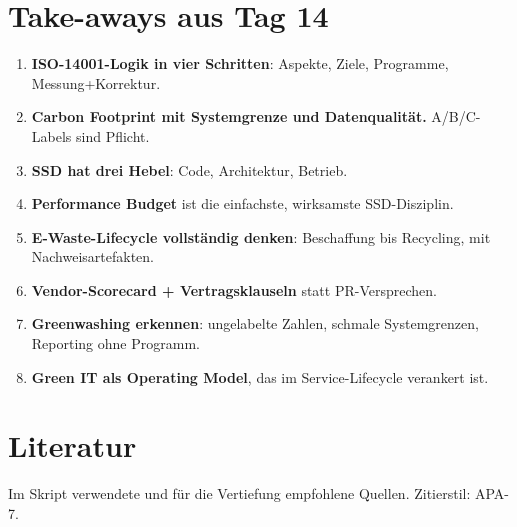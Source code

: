 \documentclass[11pt,a4paper,oneside]{article}
\begin{document}
\section{Take-aways aus Tag 14}

\begin{enumerate}
  \item \textbf{ISO-14001-Logik in vier Schritten}: Aspekte, Ziele, Programme, Messung+Korrektur.
  \item \textbf{Carbon Footprint mit Systemgrenze und Datenqualität.} A/B/C-Labels sind Pflicht.
  \item \textbf{SSD hat drei Hebel}: Code, Architektur, Betrieb.
  \item \textbf{Performance Budget} ist die einfachste, wirksamste SSD-Disziplin.
  \item \textbf{E-Waste-Lifecycle vollständig denken}: Beschaffung bis Recycling, mit Nachweisartefakten.
  \item \textbf{Vendor-Scorecard + Vertragsklauseln} statt PR-Versprechen.
  \item \textbf{Greenwashing erkennen}: ungelabelte Zahlen, schmale Systemgrenzen, Reporting ohne Programm.
  \item \textbf{Green IT als Operating Model}, das im Service-Lifecycle verankert ist.
\end{enumerate}

\clearpage
\section{Literatur}

Im Skript verwendete und für die Vertiefung empfohlene Quellen. Zitierstil: APA-7.
\end{document}
